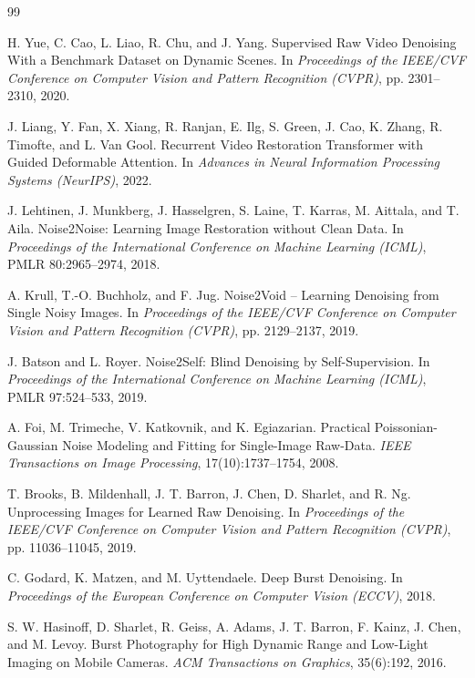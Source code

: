 \documentclass[11pt,a4paper,UTF8,fontset=fandol]{ctexart}
\begin{document}
\begin{thebibliography}{99}

 H. Yue, C. Cao, L. Liao, R. Chu, and J. Yang. Supervised Raw Video Denoising With a Benchmark Dataset on Dynamic Scenes. In \emph{Proceedings of the IEEE/CVF Conference on Computer Vision and Pattern Recognition (CVPR)}, pp. 2301--2310, 2020.

 J. Liang, Y. Fan, X. Xiang, R. Ranjan, E. Ilg, S. Green, J. Cao, K. Zhang, R. Timofte, and L. Van Gool. Recurrent Video Restoration Transformer with Guided Deformable Attention. In \emph{Advances in Neural Information Processing Systems (NeurIPS)}, 2022.

 J. Lehtinen, J. Munkberg, J. Hasselgren, S. Laine, T. Karras, M. Aittala, and T. Aila. Noise2Noise: Learning Image Restoration without Clean Data. In \emph{Proceedings of the International Conference on Machine Learning (ICML)}, PMLR 80:2965--2974, 2018.

 A. Krull, T.-O. Buchholz, and F. Jug. Noise2Void -- Learning Denoising from Single Noisy Images. In \emph{Proceedings of the IEEE/CVF Conference on Computer Vision and Pattern Recognition (CVPR)}, pp. 2129--2137, 2019.

 J. Batson and L. Royer. Noise2Self: Blind Denoising by Self-Supervision. In \emph{Proceedings of the International Conference on Machine Learning (ICML)}, PMLR 97:524--533, 2019.

 A. Foi, M. Trimeche, V. Katkovnik, and K. Egiazarian. Practical Poissonian-Gaussian Noise Modeling and Fitting for Single-Image Raw-Data. \emph{IEEE Transactions on Image Processing}, 17(10):1737--1754, 2008.

 T. Brooks, B. Mildenhall, J. T. Barron, J. Chen, D. Sharlet, and R. Ng. Unprocessing Images for Learned Raw Denoising. In \emph{Proceedings of the IEEE/CVF Conference on Computer Vision and Pattern Recognition (CVPR)}, pp. 11036--11045, 2019.

 C. Godard, K. Matzen, and M. Uyttendaele. Deep Burst Denoising. In \emph{Proceedings of the European Conference on Computer Vision (ECCV)}, 2018.

 S. W. Hasinoff, D. Sharlet, R. Geiss, A. Adams, J. T. Barron, F. Kainz, J. Chen, and M. Levoy. Burst Photography for High Dynamic Range and Low-Light Imaging on Mobile Cameras. \emph{ACM Transactions on Graphics}, 35(6):192, 2016.


\end{thebibliography}
\end{document}
